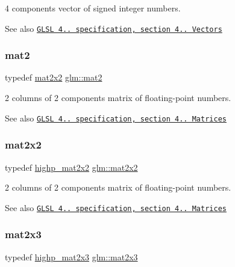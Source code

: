 4 components vector of signed integer numbers.

\begin{DoxySeeAlso}{See also}
\href{http://www.opengl.org/registry/doc/GLSLangSpec.4.20.8.pdf}{\tt G\+L\+SL 4.. specification, section 4.. Vectors} 
\end{DoxySeeAlso}
\mbox{\label{group__core__types_ga8357ec0aab6f8cf69313592492663c3f}} 
\subsubsection{\texorpdfstring{mat2}{mat2}}
{\footnotesize\ttfamily typedef \hyperlink{group__core__types_gaeddc14adb4963d9bad73866cc202fb40}{mat2x2} \hyperlink{group__core__types_ga8357ec0aab6f8cf69313592492663c3f}{glm\+::mat2}}

2 columns of 2 components matrix of floating-\/point numbers.

\begin{DoxySeeAlso}{See also}
\href{http://www.opengl.org/registry/doc/GLSLangSpec.4.20.8.pdf}{\tt G\+L\+SL 4.. specification, section 4.. Matrices} 
\end{DoxySeeAlso}
\mbox{\label{group__core__types_gaeddc14adb4963d9bad73866cc202fb40}} 
\subsubsection{\texorpdfstring{mat2x2}{mat2x2}}
{\footnotesize\ttfamily typedef \hyperlink{group__core__precision_gacdb012ddb9e783ed51b0ee009bf0d822}{highp\+\_\+mat2x2} \hyperlink{group__core__types_gaeddc14adb4963d9bad73866cc202fb40}{glm\+::mat2x2}}

2 columns of 2 components matrix of floating-\/point numbers.

\begin{DoxySeeAlso}{See also}
\href{http://www.opengl.org/registry/doc/GLSLangSpec.4.20.8.pdf}{\tt G\+L\+SL 4.. specification, section 4.. Matrices} 
\end{DoxySeeAlso}
\mbox{\label{group__core__types_gaea02797b8231f6dd9380345f6ff12155}} 
\subsubsection{\texorpdfstring{mat2x3}{mat2x3}}
{\footnotesize\ttfamily typedef \hyperlink{group__core__precision_ga9d61903aea75d6932829cd049f2e622a}{highp\+\_\+mat2x3} \hyperlink{group__core__types_gaea02797b8231f6dd9380345f6ff12155}{glm\+::mat2x3}}

